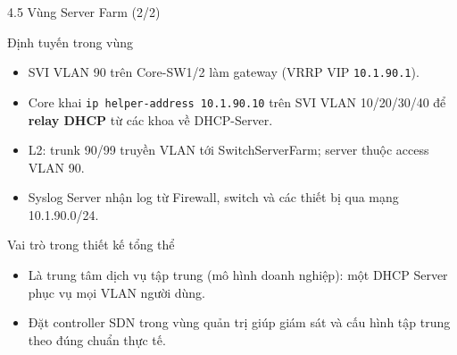 \begin{frame}{4.5 Vùng Server Farm (2/2)}
    \small
    \begin{block}{Định tuyến trong vùng}
        \begin{itemize}
            \item SVI VLAN 90 trên Core-SW1/2 làm gateway (VRRP VIP
                  \texttt{10.1.90.1}).
            \item Core khai \texttt{ip helper-address 10.1.90.10} trên
                  SVI VLAN 10/20/30/40 để \textbf{relay DHCP} từ các
                  khoa về DHCP-Server.
            \item L2: trunk 90/99 truyền VLAN tới SwitchServerFarm;
                  server thuộc access VLAN 90.
            \item Syslog Server nhận log từ Firewall, switch và các thiết
                bị qua mạng 10.1.90.0/24.
        \end{itemize}
    \end{block}
    \vspace{0.12cm}
    \begin{block}{Vai trò trong thiết kế tổng thể}
        \begin{itemize}
            \item Là trung tâm dịch vụ tập trung (mô hình doanh nghiệp):
                  một DHCP Server phục vụ mọi VLAN người dùng.
            \item Đặt controller SDN trong vùng quản trị giúp giám sát và
                  cấu hình tập trung theo đúng chuẩn thực tế.
        \end{itemize}
    \end{block}
\end{frame}

